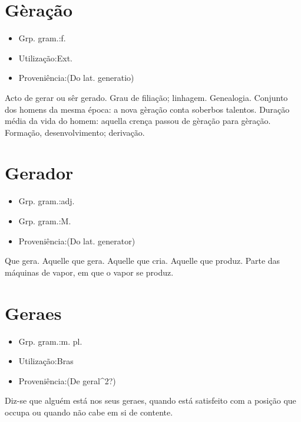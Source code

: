 \section{Gèração}
\begin{itemize}
\item {Grp. gram.:f.}
\end{itemize}
\begin{itemize}
\item {Utilização:Ext.}
\end{itemize}
\begin{itemize}
\item {Proveniência:(Do lat. \textunderscore generatio\textunderscore )}
\end{itemize}
Acto de gerar ou sêr gerado.
Grau de filiação; linhagem.
Genealogia.
Conjunto dos homens da mesma época: \textunderscore a nova gèração conta soberbos talentos\textunderscore .
Duração média da vida do homem: \textunderscore aquella crença passou de gèração para gèração\textunderscore .
Formação, desenvolvimento; derivação.
\section{Gerador}
\begin{itemize}
\item {Grp. gram.:adj.}
\end{itemize}
\begin{itemize}
\item {Grp. gram.:M.}
\end{itemize}
\begin{itemize}
\item {Proveniência:(Do lat. \textunderscore generator\textunderscore )}
\end{itemize}
Que gera.
Aquelle que gera.
Aquelle que cria.
Aquelle que produz.
Parte das máquinas de vapor, em que o vapor se produz.
\section{Geraes}
\begin{itemize}
\item {Grp. gram.:m. pl.}
\end{itemize}
\begin{itemize}
\item {Utilização:Bras}
\end{itemize}
\begin{itemize}
\item {Proveniência:(De \textunderscore geral\textunderscore ^2?)}
\end{itemize}
Diz-se que alguém está nos seus \textunderscore geraes\textunderscore , quando está satisfeito com a posição que occupa ou quando não cabe em si de contente.
